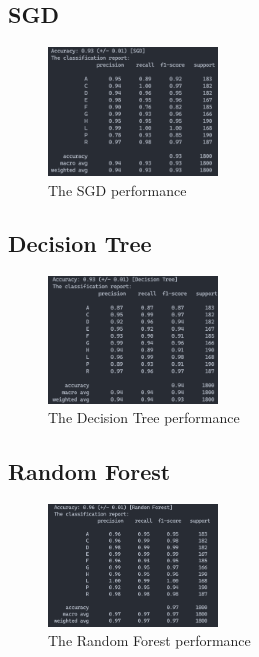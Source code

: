 \documentclass[11pt,en]{elegantpaper}
\begin{document}
\subsection*{SGD}
\begin{figure}[H]
	\centering
	\includegraphics[width=0.4\textwidth]{image/sgdpf}
	\caption{The SGD performance}
	\label{sgdpf}
\end{figure}

\subsection*{Decision Tree}
\begin{figure}[H]
	\centering
	\includegraphics[width=0.4\textwidth]{image/dtpf}
	\caption{The Decision Tree performance}
	\label{dtpf}
\end{figure}

\subsection*{Random Forest}
\begin{figure}[H]
	\centering
	\includegraphics[width=0.4\textwidth]{image/rfpf}
	\caption{The Random Forest performance}
	\label{rfpf}
\end{figure}
\end{document}
